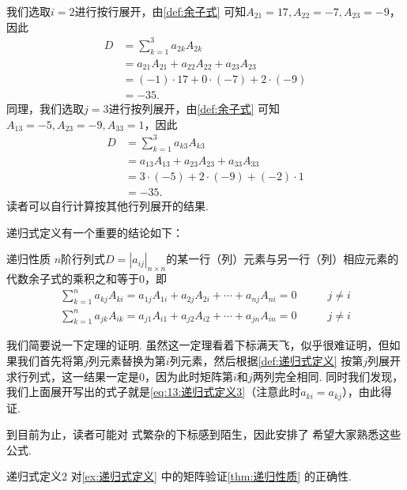 \begin{solution}
    我们选取$i=2$进行按行展开，由\autoref{def:余子式} 可知$A_{21}=17,A_{22}=-7,A_{23}=-9$，因此
    \begin{align*}
        D & =\sum_{k=1}^{3}a_{2k}A_{2k}              \\
          & =a_{21}A_{21}+a_{22}A_{22}+a_{23}A_{23}  \\
          & =(-1) \cdot 17+0 \cdot (-7)+2 \cdot (-9) \\
          & =-35.
    \end{align*}
    同理，我们选取$j=3$进行按列展开，由\autoref{def:余子式} 可知$A_{13}=-5,A_{23}=-9,A_{33}=1$，因此
    \begin{align*}
        D & =\sum_{k=1}^{3}a_{k3}A_{k3}             \\
          & =a_{13}A_{13}+a_{23}A_{23}+a_{33}A_{33} \\
          & =3 \cdot (-5)+2 \cdot (-9)+(-2) \cdot 1 \\
          & =-35.
    \end{align*}
    读者可以自行计算按其他行列展开的结果.
\end{solution}

递归式定义有一个重要的结论如下：
\begin{theorem}{}{递归性质}
    $n$阶行列式$D=|a_{ij}|_{n \times n}$的某一行（列）元素与另一行（列）相应元素的代数余子式的乘积之和等于0，即
    \begin{align}
        \label{eq:13:递归式定义3}
        \sum_{k=1}^{n}a_{kj}A_{ki}=a_{1j}A_{1i}+a_{2j}A_{2i}+\cdots+a_{nj}A_{ni}=0 & \qquad j \neq i \\
        \label{eq:13:递归式定义4}
        \sum_{k=1}^{n}a_{jk}A_{ik}=a_{j1}A_{i1}+a_{j2}A_{i2}+\cdots+a_{jn}A_{in}=0 & \qquad j \neq i
    \end{align}
\end{theorem}

我们简要说一下定理的证明. 虽然这一定理看着下标满天飞，似乎很难证明，但如果我们首先将第$j$列元素替换为第$i$列元素，然后根据\autoref{def:递归式定义} 按第$j$列展开求行列式，这一结果一定是0，因为此时矩阵第$i$和$j$两列完全相同. 同时我们发现，我们上面展开写出的式子就是\autoref{eq:13:递归式定义3}（注意此时$a_{ki}=a_{kj}$），由此得证.

到目前为止，读者可能对 式繁杂的下标感到陌生，因此安排了 希望大家熟悉这些公式.
\begin{example}{}{递归式定义2}
    对\autoref{ex:递归式定义} 中的矩阵验证\autoref{thm:递归性质} 的正确性.
\end{example}

